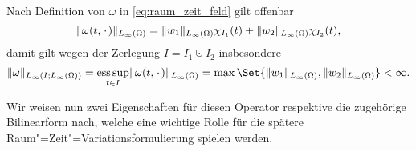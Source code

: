 \begin{Bemerkung}
\label{bemerkung:raum_zeit_feld_norm_zeitunabhaengig}
    Nach Definition von $\omega$ in \cref{eq:raum_zeit_feld} gilt offenbar
    \begin{equation}
        \lVert\omega(t, {\mkern2mu\cdot\mkern2mu})\rVert_{L_{\infty}(\Omega)} = \lVert w_{1}\rVert_{L_{\infty}(\Omega)} \chi_{I_{1}}(t) + \lVert w_{2}\rVert_{L_{\infty}(\Omega)} \chi_{I_{2}}(t),
    \end{equation}
    damit gilt wegen der Zerlegung $I = I_{1} \cupdot I_{2}$ insbesondere
    \begin{equation}
        \norm{\omega}_{L_{\infty}(I; L_{\infty}(\Omega))} = \esssup_{t \in I} \norm{\omega(t, \blank)}_{L_{\infty}(\Omega)} = \max\Set{ \norm{w_{1}}_{L_{\infty}(\Omega)}, \norm{w_{2}}_{L_{\infty}(\Omega)} } < \infty.
    \end{equation}
\end{Bemerkung}

Wir weisen nun zwei Eigenschaften für diesen Operator respektive die zugehörige Bilinearform nach, welche eine wichtige Rolle für die spätere Raum"=Zeit"=Variationsformulierung spielen werden.

